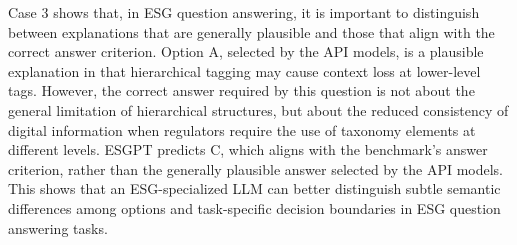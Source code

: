 \documentclass[11pt]{article}
\begin{document}
Case 3 shows that, in ESG question answering, it is important to distinguish between explanations that are generally plausible and those that align with the correct answer criterion. Option A, selected by the API models, is a plausible explanation in that hierarchical tagging may cause context loss at lower-level tags. However, the correct answer required by this question is not about the general limitation of hierarchical structures, but about the reduced consistency of digital information when regulators require the use of taxonomy elements at different levels. \textsf{ESGPT} predicts C, which aligns with the benchmark's answer criterion, rather than the generally plausible answer selected by the API models. This shows that an ESG-specialized LLM can better distinguish subtle semantic differences among options and task-specific decision boundaries in ESG question answering tasks.

\end{document}
